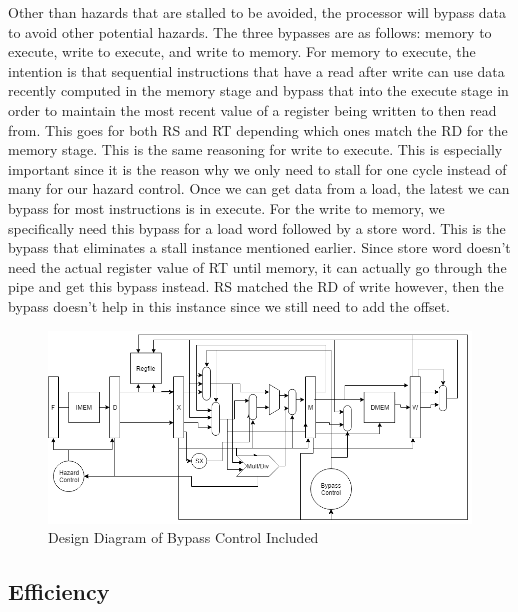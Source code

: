 \documentclass[letterpaper]{article} %
\begin{document}
Other than hazards that are stalled to be avoided, the processor will bypass data to avoid other potential hazards. The three bypasses are as follows: memory to execute, write to execute, and write to memory. For memory to execute, the intention is that sequential instructions that have a read after write can use data recently computed in the memory stage and bypass that into the execute stage in order to maintain the most recent value of a register being written to then read from. This goes for both RS and RT depending which ones match the RD for the memory stage. This is the same reasoning for write to execute. This is especially important since it is the reason why we only need to stall for one cycle instead of many for our hazard control. Once we can get data from a load, the latest we can bypass for most instructions is in execute. For the write to memory, we specifically need this bypass for a load word followed by a store word. This is the bypass that eliminates a stall instance mentioned earlier. Since store word doesn't need the actual register value of RT until memory, it can actually go through the pipe and get this bypass instead. RS matched the RD of write however, then the bypass doesn't help in this instance since we still need to add the offset.

\begin{figure}[htb!]
    \centering
    \includegraphics[width=.7\textwidth]{bypassDiagram.png}
    \caption{Design Diagram of Bypass Control Included}
\end{figure}

\subsection*{Efficiency}
\end{document}
